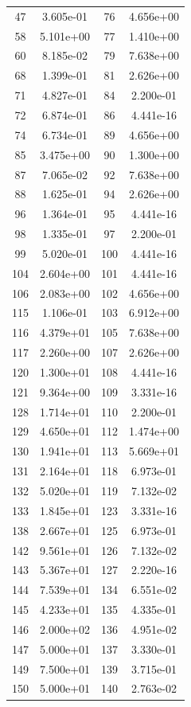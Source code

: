 \documentclass[12pt]{article}
\begin{document}
\begin{longtable}{@{}cccc@{}}
47 & 3.605e-01 & 76 & 4.656e+00 \\
58 & 5.101e+00 & 77 & 1.410e+00 \\
60 & 8.185e-02 & 79 & 7.638e+00 \\
68 & 1.399e-01 & 81 & 2.626e+00 \\
71 & 4.827e-01 & 84 & 2.200e-01 \\
72 & 6.874e-01 & 86 & 4.441e-16 \\
74 & 6.734e-01 & 89 & 4.656e+00 \\
85 & 3.475e+00 & 90 & 1.300e+00 \\
87 & 7.065e-02 & 92 & 7.638e+00 \\
88 & 1.625e-01 & 94 & 2.626e+00 \\
96 & 1.364e-01 & 95 & 4.441e-16 \\
98 & 1.335e-01 & 97 & 2.200e-01 \\
99 & 5.020e-01 & 100 & 4.441e-16 \\
104 & 2.604e+00 & 101 & 4.441e-16 \\
106 & 2.083e+00 & 102 & 4.656e+00 \\
115 & 1.106e-01 & 103 & 6.912e+00 \\
116 & 4.379e+01 & 105 & 7.638e+00 \\
117 & 2.260e+00 & 107 & 2.626e+00 \\
120 & 1.300e+01 & 108 & 4.441e-16 \\
121 & 9.364e+00 & 109 & 3.331e-16 \\
128 & 1.714e+01 & 110 & 2.200e-01 \\
129 & 4.650e+01 & 112 & 1.474e+00 \\
130 & 1.941e+01 & 113 & 5.669e+01 \\
131 & 2.164e+01 & 118 & 6.973e-01 \\
132 & 5.020e+01 & 119 & 7.132e-02 \\
133 & 1.845e+01 & 123 & 3.331e-16 \\
138 & 2.667e+01 & 125 & 6.973e-01 \\
142 & 9.561e+01 & 126 & 7.132e-02 \\
143 & 5.367e+01 & 127 & 2.220e-16 \\
144 & 7.539e+01 & 134 & 6.551e-02 \\
145 & 4.233e+01 & 135 & 4.335e-01 \\
146 & 2.000e+02 & 136 & 4.951e-02 \\
147 & 5.000e+01 & 137 & 3.330e-01 \\
149 & 7.500e+01 & 139 & 3.715e-01 \\
150 & 5.000e+01 & 140 & 2.763e-02 \\

\end{longtable}
\end{document}
